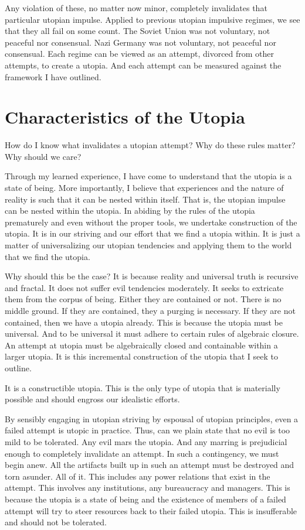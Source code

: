 \documentclass[12pt]{article}
\begin{document}
Any violation of these, no matter now minor, completely invalidates that particular utopian impulse.
Applied to previous utopian impulsive regimes, we see that they all fail on some count.
The Soviet Union was not voluntary, not peaceful nor consensual.
Nazi Germany was not voluntary, not peaceful nor consensual.
Each regime can be viewed as an attempt, divorced from other attempts, to create a utopia.
And each attempt can be measured against the framework I have outlined.

\section{Characteristics of the Utopia}
How do I know what invalidates a utopian attempt?
Why do these rules matter?
Why should we care?

Through my learned experience, I have come to understand that the utopia is a state of being.
More importantly, I believe that experiences and the nature of reality is such that it can be nested within itself.
That is, the utopian impulse can be nested within the utopia.
In abiding by the rules of the utopia prematurely and even without the proper tools, we undertake construction of the utopia.
It is in our striving and our effort that we find a utopia within.
It is just a matter of universalizing our utopian tendencies and applying them to the world that we find the utopia.

Why should this be the case?
It is because reality and universal truth is recursive and fractal.
It does not suffer evil tendencies moderately.
It seeks to extricate them from the corpus of being.
Either they are contained or not.
There is no middle ground.
If they are contained, they a purging is necessary.
If they are not contained, then we have a utopia already.
This is because the utopia must be universal.
And to be universal it must adhere to certain rules of algebraic closure.
An attempt at utopia must be algebraically closed and containable within a larger utopia.
It is this incremental construction of the utopia that I seek to outline.

It is a constructible utopia.
This is the only type of utopia that is materially possible and should engross our idealistic efforts.

By sensibly engaging in utopian striving by espousal of utopian principles, even a failed attempt is utopic in practice.
Thus, can we plain state that no evil is too mild to be tolerated.
Any evil mars the utopia.
And any marring is prejudicial enough to completely invalidate an attempt.
In such a contingency, we must begin anew.
All the artifacts built up in such an attempt must be destroyed and torn asunder.
All of it.
This includes any power relations that exist in the attempt.
This involves any institutions, any bureaucracy and managers.
This is because the utopia is a state of being and the existence of members of a failed attempt will try to steer resources back to their failed utopia.
This is insufferable and should not be tolerated.
\end{document}
